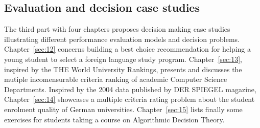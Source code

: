 % 
%
%

\begin{partbacktext}
\part{Evaluation and decision case studies}
\noindent The third part with four chapters proposes decision making case studies illustrating different performance evaluation models and decision problems. Chapter~\ref{sec:12} concerns building a best choice recommendation for helping a young student to select a foreign language study program. Chapter~\ref{sec:13}, inspired by the THE World University Rankings, presents and discusses the mutiple incomensurable criteria ranking of academic Computer Science Departments. Inspired by the 2004 data published by DER SPIEGEL magazine, Chapter~\ref{sec:14} showcases a multiple criteria rating problem about the student enrolment quality of German universities. Chapter~\ref{sec:15} lists finally some exercises for students taking a course on Algorithmic Decision Theory. 
\end{partbacktext}